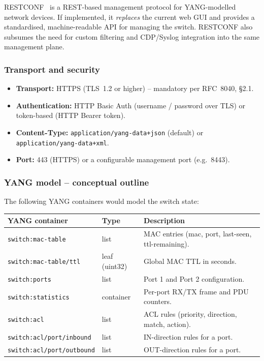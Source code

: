 \documentclass[12pt,a4paper]{article}
\begin{document}
RESTCONF~\cite{rfc8040} is a REST-based management protocol for YANG-modelled
network devices.  If implemented, it \emph{replaces} the current web GUI and
provides a standardised, machine-readable API for managing the switch.
RESTCONF also subsumes the need for custom filtering and CDP/Syslog integration
into the same management plane.

\subsubsection{Transport and security}

\begin{itemize}[noitemsep]
  \item \textbf{Transport:} HTTPS (TLS~1.2 or higher) -- mandatory per
    RFC~8040, §2.1.
  \item \textbf{Authentication:} HTTP Basic Auth (username / password over TLS)
    or token-based (HTTP Bearer token).
  \item \textbf{Content-Type:}
    \texttt{application/yang-data+json} (default) or
    \texttt{application/yang-data+xml}.
  \item \textbf{Port:} 443 (HTTPS) or a configurable management port (e.g.\
    8443).
\end{itemize}

\subsubsection{YANG model -- conceptual outline}

The following YANG containers would model the switch state:

\begin{center}
\begin{tabular}{lll}
\toprule
\textbf{YANG container}          & \textbf{Type}   & \textbf{Description} \\
\midrule
\texttt{switch:mac-table}         & list            & MAC entries (mac, port, last-seen, ttl-remaining). \\
\texttt{switch:mac-table/ttl}     & leaf (uint32)   & Global MAC TTL in seconds. \\
\texttt{switch:ports}             & list            & Port 1 and Port 2 configuration. \\
\texttt{switch:statistics}        & container       & Per-port RX/TX frame and PDU counters. \\
\texttt{switch:acl}               & list            & ACL rules (priority, direction, match, action). \\
\texttt{switch:acl/port/inbound}  & list            & IN-direction rules for a port. \\
\texttt{switch:acl/port/outbound} & list            & OUT-direction rules for a port. \\
\bottomrule
\end{tabular}
\end{center}
\end{document}
